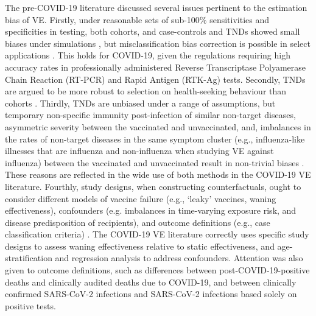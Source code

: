 \documentclass[12pt]{article}
\begin{document}
The pre-COVID-19 literature discussed several issues pertinent to the estimation bias of VE. Firstly, under reasonable sets of sub-100\% sensitivities and specificities in testing, both cohorts, and case-controls and TNDs showed small biases under simulations \citep{orenstein2007methodologic}, but misclassification bias correction is possible in select applications \citep{patel2020postlicensure, endo2020bias}. This holds for COVID-19, given the regulations requiring high accuracy rates in professionally administered Reverse Transcriptase Polyamerase Chain Reaction (RT-PCR) and Rapid Antigen (RTK-Ag) tests. Secondly, TNDs are argued to be more robust to selection on health-seeking behaviour than cohorts \citep{jackson2013test}. Thirdly, TNDs are unbiased under a range of assumptions, but temporary non-specific immunity post-infection of similar non-target diseases, asymmetric severity between the vaccinated and unvaccinated, and, imbalances in the rates of non-target diseases in the same symptom cluster (e.g., influenza-like illnesses that are influenza and non-influenza when studying VE against influenza) between the vaccinated and unvaccinated result in non-trivial biases \citep{foppa2013case, jackson2013test, jackson2018impact}. These reasons are reflected in the wide use of both methods in the COVID-19 VE literature. Fourthly, study designs, when constructing counterfactuals, ought to consider different models of vaccine failure (e.g., `leaky' vaccines, waning effectiveness), confounders (e.g. imbalances in time-varying exposure risk, and disease predisposition of recipients), and outcome definitions (e.g., case classification criteria) \citep{crowcroft2018framework}. The COVID-19 VE literature correctly uses specific study designs to assess waning effectiveness relative to static effectiveness, and age-stratification and regression analysis to address confounders. Attention was also given to outcome definitions, such as differences between post-COVID-19-positive deaths and clinically audited deaths due to COVID-19, and between clinically confirmed SARS-CoV-2 infections and SARS-CoV-2 infections based solely on positive tests.
\end{document}
